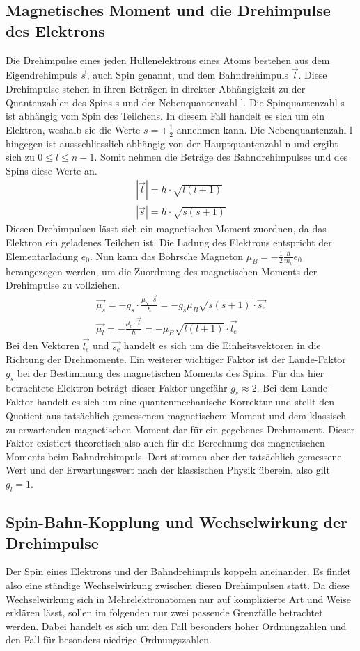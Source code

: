 \subsection{Magnetisches Moment und die Drehimpulse des Elektrons}
Die Drehimpulse eines jeden Hüllenelektrons eines Atoms bestehen aus dem Eigendrehimpuls $\vec{s}$, auch Spin genannt, und dem Bahndrehimpuls $\vec{l}$. Diese Drehimpulse stehen in ihren Beträgen in direkter Abhängigkeit zu der Quantenzahlen des Spins s und der Nebenquantenzahl l. Die Spinquantenzahl s ist abhängig vom Spin des Teilchens. In diesem Fall handelt es sich um ein Elektron, weshalb sie die Werte $s=\pm \frac{1}{2}$ annehmen kann. \linebreak
Die Nebenquantenzahl l hingegen ist aussschliesslich abhängig von der Hauptquantenzahl n und ergibt sich zu $0\leq l\leq n-1$. Somit nehmen die Beträge des Bahndrehimpulses und des Spins diese Werte an.
\begin{align}
    |\vec{l}|=h\cdot\sqrt{l(l+1)}\\
    |\vec{s}|=h\cdot\sqrt{s(s+1)}
\end{align}
Diesen Drehimpulsen lässt sich ein magnetisches Moment zuordnen, da das Elektron ein geladenes Teilchen ist. Die Ladung des Elektrons entspricht der Elementarladung $e_0$. Nun kann das Bohrsche Magneton $\mu_B = -\frac{1}{2}\frac{\hbar}{m_0}e_0$ herangezogen werden, um die Zuordnung des magnetischen Moments der Drehimpulse zu vollziehen.
\begin{align}
    &\vec{\mu_s}=-g_s\cdot\frac{\mu_b\cdot \vec{s}}{\hbar}=-g_s\mu_B\sqrt{s(s+1)}\cdot\vec{s_e}&\\
   & \vec{\mu_l}=-\frac{\mu_b\cdot \vec{l}}{\hbar}=-\mu_B\sqrt{l(l+1)}\cdot\vec{l_e}&
\end{align}
Bei den Vektoren $\vec{l_e}$ und $\vec{s_e}$ handelt es sich um die Einheitsvektoren in die Richtung der Drehmomente. Ein weiterer wichtiger Faktor ist der Lande-Faktor $g_s$ bei der Bestimmung des magnetischen Moments des Spins. Für das hier betrachtete Elektron beträgt dieser Faktor ungefähr $g_s\approx 2$. Bei dem Lande-Faktor handelt es sich um eine quantenmechanische Korrektur und stellt den Quotient aus tatsächlich gemessenem magnetischem Moment und dem klassisch zu erwartenden magnetischen Moment dar für ein gegebenes Drehmoment. Dieser Faktor existiert theoretisch also auch für die Berechnung des magnetischen Moments beim Bahndrehimpuls. Dort stimmen aber der tatsächlich gemessene Wert und der Erwartungswert nach der klassischen Physik überein, also gilt $g_l=1$. 
\subsection{Spin-Bahn-Kopplung und Wechselwirkung der Drehimpulse}
Der Spin eines Elektrons und der Bahndrehimpuls koppeln aneinander. Es findet also eine ständige Wechselwirkung zwischen diesen Drehimpulsen statt. Da diese Wechselwirkung sich in Mehrelektronatomen nur auf komplizierte Art und Weise erklären lässt, sollen im folgenden nur zwei passende Grenzfälle betrachtet werden. Dabei handelt es sich um den Fall besonders hoher Ordnungzahlen und den Fall für besonders niedrige Ordnungszahlen.
